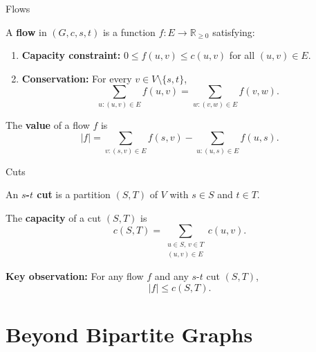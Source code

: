 \documentclass[aspectratio=169]{beamer}
\newcommand{\R}{\mathbb{R}}
\begin{document}
\begin{frame}{Flows}
  \begin{definition}
    A \textbf{flow} in $(G, c, s, t)$ is a function $f : E \to \R_{\geq 0}$
    satisfying:
    \begin{enumerate}
      \item \textbf{Capacity constraint:} $0 \leq f(u,v) \leq c(u,v)$ for all
            $(u,v) \in E$.
      \item \textbf{Conservation:} For every $v \in V \setminus \{s, t\}$,
            \[
              \sum_{u:(u,v)\in E} f(u,v) = \sum_{w:(v,w)\in E} f(v,w).
            \]
    \end{enumerate}
  \end{definition}

  \begin{definition}
    The \textbf{value} of a flow $f$ is
    \[
      |f| = \sum_{v:(s,v)\in E} f(s,v) - \sum_{u:(u,s)\in E} f(u,s).
    \]
  \end{definition}
\end{frame}

\begin{frame}{Cuts}
  \begin{definition}
    An \textbf{$s$-$t$ cut} is a partition $(S, T)$ of $V$ with $s \in S$ and
    $t \in T$.
  \end{definition}

  \begin{definition}
    The \textbf{capacity} of a cut $(S, T)$ is
    \[
      c(S, T) = \sum_{\substack{u \in S,\, v \in T \\ (u,v) \in E}} c(u,v).
    \]
  \end{definition}

  \vspace{0.5em}
  \textbf{Key observation:} For any flow $f$ and any $s$-$t$ cut $(S,T)$,
  \[
    |f| \leq c(S,T).
  \]
\end{frame}

\section{Beyond Bipartite Graphs}
\end{document}
